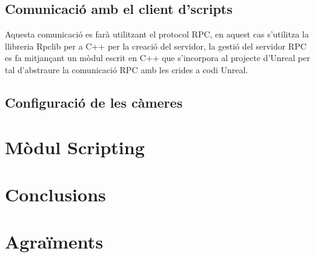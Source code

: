 \documentclass[10pt,a4paper,twocolumn,twoside]{article}
\begin{document}
\subsection{Comunicació amb el client d'scripts}

Aquesta comunicació es farà utilitzant el protocol RPC, en aquest cas s'utilitza la llibreria Rpclib\cite{rpclib} per a C++ per la creació del servidor, la gestió del servidor RPC es fa mitjançant un mòdul escrit en C++ que s'incorpora al projecte d'Unreal per tal d'abstraure la comunicació RPC amb les crides a codi Unreal.


\subsection{Configuració de les càmeres}
\label{section:cameraconfig}

\section{Mòdul Scripting}

\section{Conclusions}


\section*{Agraïments}
\end{document}
